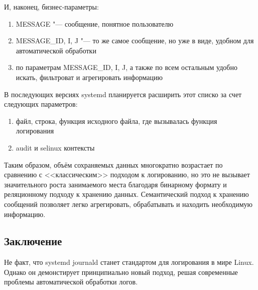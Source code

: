 \documentclass[10pt, a5paper]{article}
\begin{document}
И, наконец, бизнес-параметры:

\begin{enumerate}
  \item MESSAGE "--- сообщение, понятное пользователю
  \item MESSAGE\_ID, I, J "--- то же самое сообщение, но уже в виде, удобном для автоматической обработки
  \item по параметрам MESSAGE\_ID, I, J, а также по всем остальным удобно искать, фильтроват и агрегировать информацию
\end{enumerate}

В последующих версиях systemd планируется расширить этот списко за счет следующих параметров:

\begin{enumerate}
  \item файл, строка, функция исходного файла, где вызывалась функция логирования
  \item audit и selinux контексты
\end{enumerate}

Таким образом, объём сохраняемых данных многократно возрастает  по сравнению с <<классическим>> подходом к логированию, но это не вызывает значительного роста занимаемого места благодаря бинарному формату и реляционному подходу к хранению данных. Семантический подход к хранению сообщений позволяет легко агрегировать, обрабатывать и находить необходимую информацию.

\subsection*{Заключение}

Не факт, что systemd journald станет стандартом для логирования в мире Linux. Однако он демонстирует принципиально новый подход, решая современные проблемы автоматической обработки логов.
\end{document}
